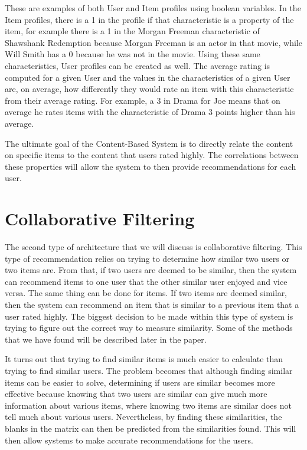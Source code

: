 \documentclass[11pt,reqno]{amsart}
\theoremstyle{definition}
\numberwithin{equation}{subsection}
\begin{document}
These are examples of both User and Item profiles using boolean variables. In the Item profiles, there is a 1 in the profile if that characteristic is a property of the item, for example there is a 1 in the Morgan Freeman characteristic of Shawshank Redemption because Morgan Freeman is an actor in that movie, while Will Smith has a 0 because he was not in the movie. Using these same characteristics, User profiles can be created as well. The average rating is computed for a given User and the values in the characteristics of a given User are, on average, how differently they would rate an item with this characteristic from their average rating. For example, a 3 in Drama for Joe means that on average he rates items with the characteristic of Drama 3 points higher than his average. 

The ultimate goal of the Content-Based System is to directly relate the content on specific items to the content that users rated highly. The correlations between these properties will allow the system to then provide recommendations for each user. \newline

\section{Collaborative Filtering}
The second type of architecture that we will discuss is collaborative filtering. This type of recommendation relies on trying to determine how similar two users or two items are. From that, if two users are deemed to be similar, then the system can recommend items to one user that the other similar user enjoyed and vice versa. The same thing can be done for items. If two items are deemed similar, then the system can recommend an item that is similar to a previous item that a user rated highly. The biggest decision to be made within this type of system is trying to figure out the correct way to measure similarity. Some of the methods that we have found will be described later in the paper. \newline

It turns out that trying to find similar items is much easier to calculate than trying to find similar users. The problem becomes that although finding similar items can be easier to solve, determining if users are similar becomes more effective because knowing that two users are similar can give much more information about various items, where knowing two items are similar does not tell much about various users. Nevertheless, by finding these similarities, the blanks in the matrix can then be predicted from the similarities found. This will then allow systems to make accurate recommendations for the users. 
\newline
\end{document}
